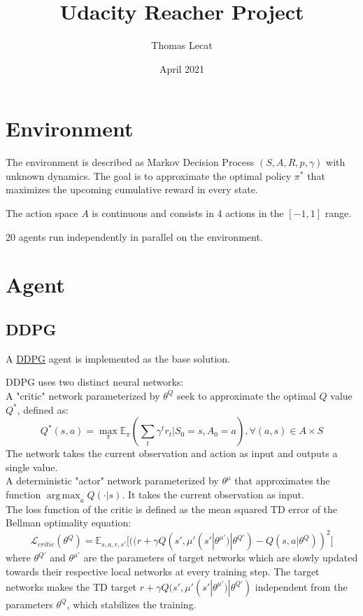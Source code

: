 \documentclass{article}
\title{Udacity Reacher Project}
\author{Thomas Lecat}
\date{April 2021}
\DeclareMathOperator*{\argmax}{arg\,max}
\begin{document}
    \maketitle


    \section{Environment}\label{sec:environment}

    The environment is described as Markov Decision Process $(S, A, R, p, \gamma)$ with unknown dynamics.
    The goal is to approximate the optimal policy $\pi^*$ that maximizes the upcoming cumulative reward in every state.

    The action space $A$ is continuous and consists in 4 actions in the $[-1, 1]$ range.

    20 agents run independently in parallel on the environment.


    \section{Agent}\label{sec:agent}

    \subsection{DDPG}\label{subsec:ddpg}


    A \href{https://arxiv.org/abs/1509.02971}{DDPG} agent
    is implemented as the base solution.

    DDPG uses two distinct neural networks: \\

    A "critic" network parameterized by $\theta^Q$ seek to approximate the optimal $Q$ value $Q^*$, defined as:
    \[
        Q^*(s, a) = \max_{\pi} \mathbb{E}_{\pi} (\sum_{t} \gamma^t r_t | S_0=s, A_0=a),  \forall (a, s) \in A \times S
    \]
    The network takes the current observation and action as input and outputs a single value.\\

    A deterministic "actor" network parameterized by $\theta^\mu$ that approximates the function $\argmax_a{Q(\cdot|s)}$.
    It takes the current observation as input.\\

    The loss function of the critic is defined as the mean squared TD error of the Bellman optimality equation:
    \[
        \mathcal{L}_{critic}(\theta^Q) = \mathbb{E}_{s, a, r, s'} \big[((r + \gamma Q(s', \mu'(s'| \theta^{\mu'})| \theta^{Q'}) - Q(s, a| \theta^Q))^2\big]
    \]
    where $\theta^{Q'}$ and $\theta^{\mu'}$ are the parameters of target networks which are slowly updated towards their respective local networks at every training step.
    The target networks makes the TD target $r + \gamma Q(s', \mu'(s'| \theta^{\mu'})| \theta^{Q'})$ independent from the parameters $\theta^Q$,
    which stabilizes the training.\\
\end{document}
